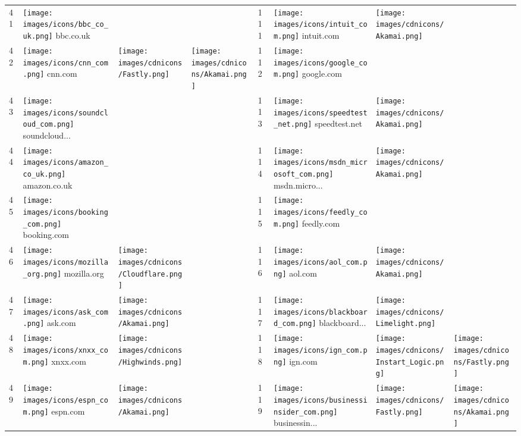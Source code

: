 \begin{table}[tbp]
\begin{tabular}{|llll|llll|}
41 & \texttt{[image: images/icons/bbc\_co\_uk.png]} bbc.co.uk & & & 111 & \texttt{[image: images/icons/intuit\_com.png]} intuit.com & \texttt{[image: images/cdnicons/Akamai.png]} & \\
42 & \texttt{[image: images/icons/cnn\_com.png]} cnn.com & \texttt{[image: images/cdnicons/Fastly.png]} & \texttt{[image: images/cdnicons/Akamai.png]} & 112 & \texttt{[image: images/icons/google\_com.png]} google.com & & \\
43 & \texttt{[image: images/icons/soundcloud\_com.png]} soundcloud... & & & 113 & \texttt{[image: images/icons/speedtest\_net.png]} speedtest.net & \texttt{[image: images/cdnicons/Akamai.png]} & \\
44 & \texttt{[image: images/icons/amazon\_co\_uk.png]} amazon.co.uk & & & 114 & \texttt{[image: images/icons/msdn\_microsoft\_com.png]} msdn.micro... & \texttt{[image: images/cdnicons/Akamai.png]} & \\
45 & \texttt{[image: images/icons/booking\_com.png]} booking.com & & & 115 & \texttt{[image: images/icons/feedly\_com.png]} feedly.com & & \\
46 & \texttt{[image: images/icons/mozilla\_org.png]} mozilla.org & \texttt{[image: images/cdnicons/Cloudflare.png]} & & 116 & \texttt{[image: images/icons/aol\_com.png]} aol.com & \texttt{[image: images/cdnicons/Akamai.png]} & \\
47 & \texttt{[image: images/icons/ask\_com.png]} ask.com & \texttt{[image: images/cdnicons/Akamai.png]} & & 117 & \texttt{[image: images/icons/blackboard\_com.png]} blackboard... & \texttt{[image: images/cdnicons/Limelight.png]} & \\
48 & \texttt{[image: images/icons/xnxx\_com.png]} xnxx.com & \texttt{[image: images/cdnicons/Highwinds.png]} & & 118 & \texttt{[image: images/icons/ign\_com.png]} ign.com & \texttt{[image: images/cdnicons/Instart\_Logic.png]} & \texttt{[image: images/cdnicons/Fastly.png]} \\
49 & \texttt{[image: images/icons/espn\_com.png]} espn.com & \texttt{[image: images/cdnicons/Akamai.png]} & & 119 & \texttt{[image: images/icons/businessinsider\_com.png]} businessin... & \texttt{[image: images/cdnicons/Fastly.png]} & \texttt{[image: images/cdnicons/Akamai.png]} \\

\end{tabular}
\end{table}
